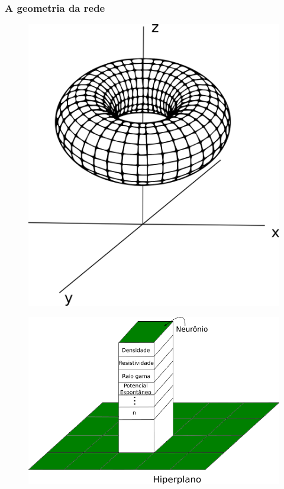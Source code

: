 \documentclass[10pt]{beamer} %
\begin{document}
\begin{frame}
	\frametitle{A geometria da rede}
	
\begin{figure}[H]
		\flushleft
		\includegraphics[scale=0.15]{Imagens/toro.png}
		\label{toro}
\end{figure}
\begin{figure}[H]
	\flushright
		\includegraphics[scale=0.4]{Imagens/hiperplano.png}
	\label{hiperplano}
\end{figure}

\end{frame}
\end{document}
